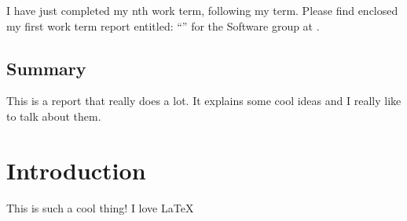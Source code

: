 \documentclass[ece]{uw-wkrpt}
\begin{document}
\begin{letter}
I have just completed my nth work term, following my \theterm{} term.
Please find enclosed my first work term report entitled:
``\thetitle'' for the Software group at \theemployer.  

\end{letter}

\begin{onehalfspacing}


\tableofcontents
\listoffigures
\listoftables
\pagebreak

\section{Summary}
This is a report that really does a lot. It explains some cool ideas and I really like to talk about them.
\end{onehalfspacing}
\mainmatter

\section{Introduction}\label{sec:intro}
This is such a cool thing! I love \LaTeX{}
\pagebreak 
\end{document}
